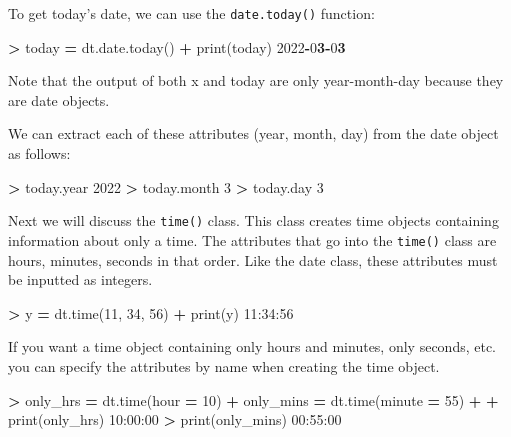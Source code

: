 \documentclass[
]{book}
\newenvironment{Shaded}{\begin{snugshade}}{\end{snugshade}}
\newcommand{\BuiltInTok}[1]{#1}
\newcommand{\DecValTok}[1]{\textcolor[rgb]{0.00,0.00,0.81}{#1}}
\newcommand{\ErrorTok}[1]{\textcolor[rgb]{0.64,0.00,0.00}{\textbf{#1}}}
\newcommand{\NormalTok}[1]{#1}
\newcommand{\OperatorTok}[1]{\textcolor[rgb]{0.81,0.36,0.00}{\textbf{#1}}}
\begin{document}
To get today's date, we can use the \texttt{date.today()} function:

\begin{Shaded}
\begin{Highlighting}[]
\OperatorTok{\textgreater{}}\NormalTok{ today }\OperatorTok{=}\NormalTok{ dt.date.today()}
\OperatorTok{+} \BuiltInTok{print}\NormalTok{(today)}
\DecValTok{2022}\OperatorTok{{-}}\DecValTok{0}\ErrorTok{3}\OperatorTok{{-}}\DecValTok{0}\ErrorTok{3}
\end{Highlighting}
\end{Shaded}

Note that the output of both x and today are only year-month-day because they are date objects.

We can extract each of these attributes (year, month, day) from the date object as follows:

\begin{Shaded}
\begin{Highlighting}[]
\OperatorTok{\textgreater{}}\NormalTok{ today.year }
\DecValTok{2022}
\OperatorTok{\textgreater{}}\NormalTok{ today.month}
\DecValTok{3}
\OperatorTok{\textgreater{}}\NormalTok{ today.day}
\DecValTok{3}
\end{Highlighting}
\end{Shaded}

Next we will discuss the \texttt{time()} class. This class creates time objects containing information about only a time. The attributes that go into the \texttt{time()} class are hours, minutes, seconds in that order. Like the date class, these attributes must be inputted as integers.

\begin{Shaded}
\begin{Highlighting}[]
\OperatorTok{\textgreater{}}\NormalTok{ y }\OperatorTok{=}\NormalTok{ dt.time(}\DecValTok{11}\NormalTok{, }\DecValTok{34}\NormalTok{, }\DecValTok{56}\NormalTok{)}
\OperatorTok{+} \BuiltInTok{print}\NormalTok{(y)}
\DecValTok{11}\NormalTok{:}\DecValTok{34}\NormalTok{:}\DecValTok{56}
\end{Highlighting}
\end{Shaded}

If you want a time object containing only hours and minutes, only seconds, etc. you can specify the attributes by name when creating the time object.

\begin{Shaded}
\begin{Highlighting}[]
\OperatorTok{\textgreater{}}\NormalTok{ only\_hrs }\OperatorTok{=}\NormalTok{ dt.time(hour }\OperatorTok{=} \DecValTok{10}\NormalTok{)}
\OperatorTok{+}\NormalTok{ only\_mins }\OperatorTok{=}\NormalTok{ dt.time(minute }\OperatorTok{=} \DecValTok{55}\NormalTok{)}
\OperatorTok{+} 
\OperatorTok{+} \BuiltInTok{print}\NormalTok{(only\_hrs)}
\DecValTok{10}\NormalTok{:}\DecValTok{00}\NormalTok{:}\DecValTok{00}
\OperatorTok{\textgreater{}} \BuiltInTok{print}\NormalTok{(only\_mins)}
\DecValTok{00}\NormalTok{:}\DecValTok{55}\NormalTok{:}\DecValTok{00}
\end{Highlighting}
\end{Shaded}
\end{document}
